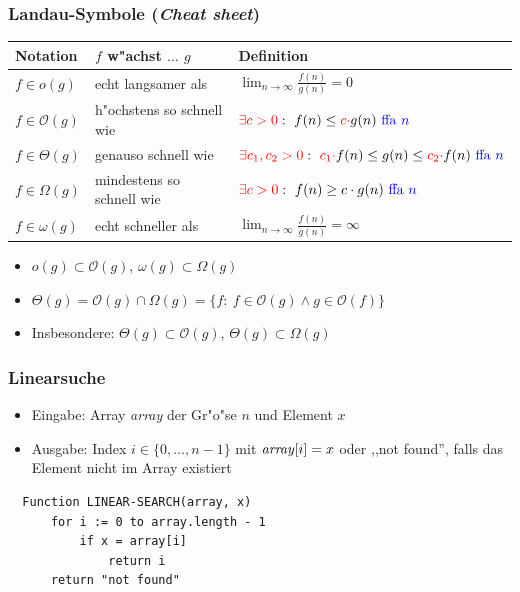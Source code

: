 \documentclass[t]{beamer}
\newcommand{\bigO}{\ensuremath{\mathcal{O}}}
\begin{document}
\begin{frame}
  \frametitle{Landau-Symbole (\emph{Cheat sheet})}
  \begin{center}
  \begin{tabular}{| l || l | l |} \hline
  \textbf{Notation} & \textbf{$f$ w"achst $\ldots$ $g$} & \textbf{Definition} \\ \hline
  $f \in o(g)$
      & echt langsamer als
      & $\lim_{n\rightarrow \infty} \frac{f(n)}{g(n)} = 0$
      \\ \hline
  $f \in \bigO(g)$
      & \footnotesize h"ochstens so schnell wie \normalsize
      & $\textcolor{red}{\exists c > 0}: \
          f(n) \leq \textcolor{red}{c\cdot} g(n) \textcolor{blue}{\text{ ffa } n}$
      \\ \hline
  $f \in \Theta(g)$
      & genauso schnell wie
      & \footnotesize $\textcolor{red}{\exists c_1, c_2 > 0}:
        \ \textcolor{red}{c_1\cdot} f(n)
            \leq g(n)
            \leq \textcolor{red}{c_2 \cdot} f(n)
          \textcolor{blue}{\text{ ffa } n}$ \normalsize
      \\ \hline
  $f \in \Omega(g)$
      & \footnotesize mindestens so schnell wie \normalsize
      & $\textcolor{red}{\exists c > 0}: \ f(n) \geq c\cdot g(n) \textcolor{blue}{\text{ ffa } n}$
      \\ \hline
  $f \in \omega(g)$
      & echt schneller als
      & $\lim_{n\rightarrow \infty} \frac{f(n)}{g(n)} = \infty$
      \\ \hline
  \end{tabular}
  \end{center}
  \begin{itemize}
  \item $o(g) \subset \bigO(g)$, $\omega(g) \subset \Omega(g)$
  \item $\Theta(g) = \bigO(g) \cap \Omega(g) = \{ f:\ f \in \bigO(g) \wedge g \in \bigO(f)\}$
  \item Insbesondere: $\Theta(g) \subset \bigO(g)$, $\Theta(g) \subset \Omega(g)$
  \end{itemize}
\end{frame}

\begin{frame}[fragile]
  \frametitle{Linearsuche}
  \begin{itemize}
  \item Eingabe: Array \emph{array} der Gr"o"se $n$ und Element $x$
  \item Ausgabe: Index $i \in \{0,\ldots,n-1\}$ mit $\text{\emph{array}}[i] = x$
                 oder ,,not found'', falls das Element nicht im Array existiert
  \end{itemize}
  \begin{lstlisting}
  Function LINEAR-SEARCH(array, x)
      for i := 0 to array.length - 1
          if x = array[i]
              return i
      return "not found"
  \end{lstlisting}
\end{frame}
\end{document}
